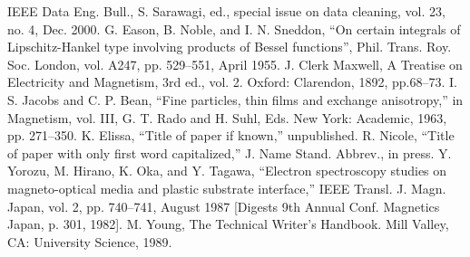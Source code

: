 \documentclass[conference]{IEEEtran}
\begin{document}
\begin{thebibliography}{00}
 IEEE Data Eng. Bull., S. Sarawagi, ed., special issue on data
cleaning, vol. 23, no. 4, Dec. 2000.
 G. Eason, B. Noble, and I. N. Sneddon, \enquote{On certain integrals of Lipschitz-Hankel type involving products of Bessel functions}, Phil. Trans. Roy. Soc. London, vol. A247, pp. 529--551, April 1955.
 J. Clerk Maxwell, A Treatise on Electricity and Magnetism, 3rd ed., vol. 2. Oxford: Clarendon, 1892, pp.68--73.
 I. S. Jacobs and C. P. Bean, ``Fine particles, thin films and exchange anisotropy,'' in Magnetism, vol. III, G. T. Rado and H. Suhl, Eds. New York: Academic, 1963, pp. 271--350.
 K. Elissa, ``Title of paper if known,'' unpublished.
 R. Nicole, ``Title of paper with only first word capitalized,'' J. Name Stand. Abbrev., in press.
 Y. Yorozu, M. Hirano, K. Oka, and Y. Tagawa, ``Electron spectroscopy studies on magneto-optical media and plastic substrate interface,'' IEEE Transl. J. Magn. Japan, vol. 2, pp. 740--741, August 1987 [Digests 9th Annual Conf. Magnetics Japan, p. 301, 1982].
 M. Young, The Technical Writer's Handbook. Mill Valley, CA: University Science, 1989.
\end{thebibliography}
\end{document}
